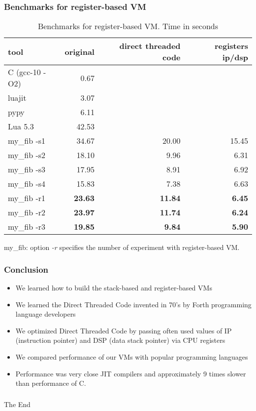 \documentclass[hyperref={colorlinks=true},xcolor=table]{beamer}
\begin{document}
\begin{frame}[fragile]
  \frametitle{Benchmarks for register-based VM}
  \begin{table}
    \begin{tabular}{ | l | r | r | r | }
      \hline
      \rowcolor{lightgray} tool & original & direct threaded
      code & registers ip/dsp \\
      \hline
      C (gcc-10 -O2) &   0.67   &       & \\
      luajit         &   3.07   &       & \\
      pypy           &   6.11   &       & \\
      Lua 5.3        &  42.53   &       & \\
      \hline
      my\_fib -s1    &  34.67   & 20.00 & 15.45 \\
      my\_fib -s2    &  18.10   & 9.96  & 6.31 \\
      my\_fib -s3    &  17.95   & 8.91  & 6.92 \\
      my\_fib -s4    &  15.83   & 7.38  & 6.63 \\
      my\_fib -r1    &  \textbf{23.63}   & \textbf{11.84} & \textbf{6.45} \\
      my\_fib -r2    &  \textbf{23.97}   & \textbf{11.74} & \textbf{6.24} \\
      my\_fib -r3    &  \textbf{19.85}   & \textbf{9.84}  & \textbf{5.90} \\
      \hline
    \end{tabular}
    \caption{Benchmarks for register-based VM. Time in seconds}
  \end{table}
  my\_fib: option \textit{-r} specifies the number of experiment with
  register-based VM.
\end{frame}

\begin{frame}[fragile]
  \frametitle{Conclusion}
  \begin{itemize}
  \item We learned how to build the stack-based and register-based VMs
  \item We learned the Direct Threaded Code invented in 70's by Forth
    programming language developers
  \item We optimized Direct Threaded Code by passing often used values
    of IP (instruction pointer) and DSP (data stack pointer) via CPU
    registers
  \item We compared performance of our VMs with popular programming
    languages
  \item Performance was very close JIT compilers and approximately 9
    times slower than performance of C.
  \end{itemize}
\end{frame}

\begin{frame}[fragile]
  \frametitle{}
  \begin{center}
    \Huge{The End}
  \end{center}
\end{frame}

\end{document}
